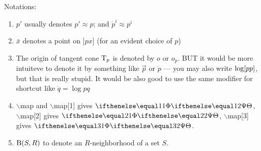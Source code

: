 Notations:
\begin{enumerate}
\item $p'$ usually denotes $p'\approx p$; 
and $\acute{p}^i\approx p^i$
\item $\bar x$ denotes a point on  $]p x]$ (for an evident choice of $p$)
\item The origin of tangent cone $\text{\rm T}_p$ is denoted by $o$ or $o_p$. BUT it would be more intuiteve to denote it by something like $\vec p$ or $\dot p$ --- you may also write $\mathrm{log}[{p}{p}]$, but that is really stupid.
It would be also good  to use the same modifier for shortcut like $\dot q=\log p q$
\item $\backslash$map and $\backslash$map[1] gives $\map$, $\backslash$map[2] gives $\map[2]$, $\backslash$map[3] gives $\map[3]$.
\item $\mathrm{B}{}(S,R)$  to denote an $R$-neighborhood of a set $S$.
\end{enumerate}

